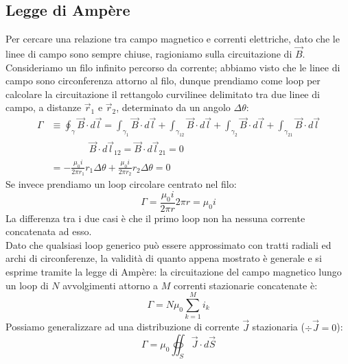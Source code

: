\subsection{Legge di Ampère}

Per cercare una relazione tra campo magnetico e correnti elettriche, dato che le linee di campo sono sempre chiuse, ragioniamo sulla circuitazione di $ \vec{B} $. \\ 
%
Consideriamo un filo infinito percorso da corrente; abbiamo visto che le linee di campo sono circonferenza attorno al filo, dunque prendiamo come loop per calcolare la circuitazione il rettangolo curvilinee delimitato tra due linee di campo, a distanze $ \vec{r}_1 $ e $ \vec{r}_2 $, determinato da un angolo $ \Delta\theta $:
\begin{equation}
	\begin{split}
		\Gamma &\equiv \oint_{\gamma} \vec{B} \cdot d\vec{l} = \int_{\gamma_1} \vec{B} \cdot d\vec{l} + \int_{\gamma_{12}} \vec{B} \cdot d\vec{l} + \int_{\gamma_2} \vec{B} \cdot d\vec{l} + \int_{\gamma_{21}} \vec{B} \cdot d\vec{l} \\ 
		       & \qquad\qquad \vec{B}\cdot d\vec{l}_{12} = \vec{B}\cdot d\vec{l}_{21} = 0 \\ 
		       &= - \displaystyle\frac{\mu_0 i}{2\pi r_1} r_1 \Delta\theta + \displaystyle\frac{\mu_0 i}{2\pi r_2} r_2 \Delta\theta = 0
	\end{split}
	\label{eq:circ-1-filo-inf}
\end{equation}
Se invece prendiamo un loop circolare centrato nel filo:
\begin{equation}
	\Gamma = \displaystyle\frac{\mu_0 i}{2\pi r} 2\pi r = \mu_0 i
	\label{eq:circ-2-filo-inf}
\end{equation}
La differenza tra i due casi è che il primo loop non ha nessuna corrente concatenata ad esso. \\ 
%
Dato che qualsiasi loop generico può essere approssimato con tratti radiali ed archi di circonferenze, la validità di quanto appena mostrato è generale e si esprime tramite la legge di Ampère: la circuitazione del campo magnetico lungo un loop di $ N $ avvolgimenti attorno a $ M $ correnti stazionarie concatenate è:
\begin{equation}
	\Gamma = N \mu_0 \displaystyle\sum_{k = 1}^{M} i_k
	\label{eq:ampere}
\end{equation}
Possiamo generalizzare ad una distribuzione di corrente $ \vec{J} $ stazionaria ($ \div\vec{J} = 0 $):
\begin{equation}
	\Gamma = \mu_0 \oiint_S \vec{J} \cdot d\vec{S}
	\label{eq:ampere-int}
\end{equation}
